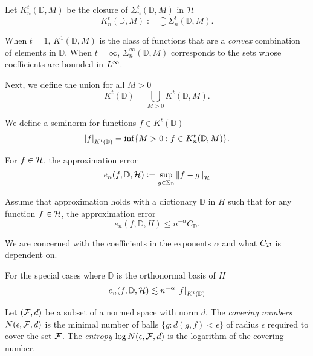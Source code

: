 Let $K^t_n(\mathbb{D}, M)$ be the closure of $\Sigma^t_n(\mathbb{D}, M)$ in
$\mathcal{H}$
\begin{equation}
    K^t_n(\mathbb{D}, M) := \closure{\Sigma^t_n(\mathbb{D}, M)}.
\end{equation}

When $t = 1$, $K^1(\mathbb{D}, M)$ is the class of functions that are a
\textit{convex} combination of elements in $\mathbb{D}$. When $t = \infty$,
$\Sigma^{\infty}_n(\mathbb{D}, M)$ corresponds to the sets whose coefficients
are bounded in $L^{\infty}$. 

Next, we define the union for all $M > 0$
\begin{equation}
    K^t(\mathbb{D}) = \bigcup_{M > 0} K^t(\mathbb{D}, M).
\end{equation}

We define a seminorm for functions $f \in K^t(\mathbb{D})$
\begin{equation}
    \label{eq:general_seminorm}
    \left| f \right|_{K^t(\mathbb{D})} = \inf \{
        M >0: f \in K^t_n(\mathbb{D}, M)
    \}.
\end{equation}

For $f \in \mathcal{H}$, the approximation error
\begin{equation}
    \label{eq:appro_err_hilbert}
    e_n(f, \mathbb{D}, \mathcal{H})
        := \sup_{g\in\Sigma_{\mathbb{D}}} \left\| f - g \right\|_{\mathcal{H}}
\end{equation}

Assume that approximation holds with a dictionary $\mathbb{D}$ in $H$ such that
for any function $f \in \mathcal{H}$, the approximation error 
\begin{equation}
    \label{eq:appro_error_general}
    e_n(f, \mathbb{D}, H) \leq n^{-\alpha} C_{\mathbb{D}}.
\end{equation}

We are concerned with the coefficients in the exponents $\alpha$ and what
$C_{\mathcal{D}}$ is dependent on.

For the special cases where $\mathbb{D}$ is the orthonormal basis of $H$
\begin{equation}
    \label{eq:appro_error_ortho}
    e_n(f, \mathbb{D}, \mathcal{H}) 
        \lesssim n^{-\alpha} \left| f \right|_{K^t(\mathbb{D})}
\end{equation}

\begin{definition}
    \label{def:covering_num}
    Let $(\mathcal{F}, d)$ be a subset of a normed space with norm $d$. The
    \textit{covering numbers} $N(\epsilon, \mathcal{F}, d)$ is the minimal number
    of balls $\{g: d(g, f) < \epsilon\}$ of radius $\epsilon$ required to cover
    the set $\mathcal{F}$. The \textit{entropy} $\log N(\epsilon, \mathcal{F}, d)$ is
    the logarithm of the covering number.
\end{definition}

